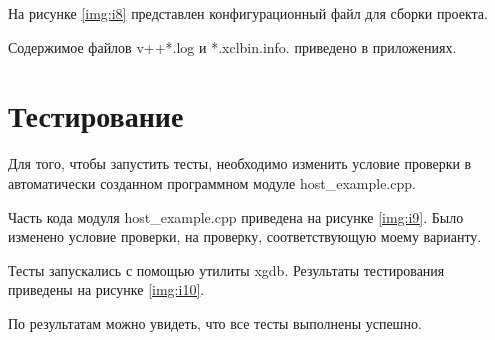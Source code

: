 На рисунке \ref{img:i8} представлен конфигурационный файл для сборки проекта.


Содержимое файлов v++*.log и *.xclbin.info. приведено в приложениях.

\chapter*{Тестирование}

Для того, чтобы запустить тесты, необходимо изменить условие проверки в автоматически созданном программном модуле host\_example.cpp.

Часть кода модуля host\_example.cpp приведена на рисунке \ref{img:i9}. Было изменено условие проверки, на проверку, соответствующую моему варианту.


Тесты запускались с помощью утилиты xgdb. Результаты тестирования приведены на рисунке \ref{img:i10}.


По результатам можно увидеть, что все тесты выполнены успешно.